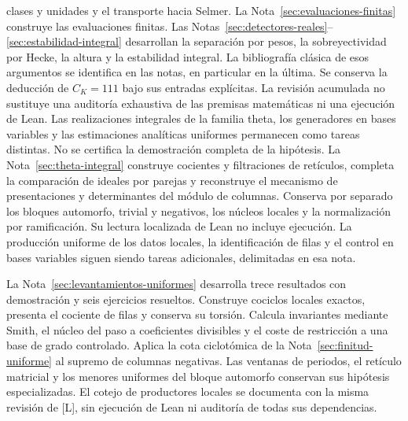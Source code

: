 clases y unidades y el transporte hacia Selmer. La Nota~\ref{sec:evaluaciones-finitas}
construye las evaluaciones finitas. Las Notas~\ref{sec:detectores-reales}--\ref{sec:estabilidad-integral}
desarrollan la separación por pesos, la sobreyectividad por Hecke,
la altura y la estabilidad integral. La bibliografía clásica de esos
argumentos se identifica en las notas, en particular en la última.
Se conserva la deducción de $C_K=111$ bajo sus entradas explícitas.
La revisión acumulada no sustituye una auditoría exhaustiva de las
premisas matemáticas ni una ejecución de Lean. Las realizaciones
integrales de la familia theta, los generadores en bases variables y
las estimaciones analíticas uniformes permanecen como tareas distintas.
No se certifica la demostración completa de la hipótesis.
La Nota~\ref{sec:theta-integral} construye cocientes y filtraciones
de retículos, completa la comparación de ideales por parejas y
reconstruye el mecanismo de presentaciones y determinantes del
módulo de columnas. Conserva por separado los bloques automorfo,
trivial y negativos, los núcleos locales y la normalización por
ramificación. Su lectura localizada de Lean no incluye ejecución.
La producción uniforme de los datos locales, la identificación
de filas y el control en bases variables siguen siendo tareas
adicionales, delimitadas en esa nota.

La Nota~\ref{sec:levantamientos-uniformes} desarrolla trece resultados
con demostración y seis ejercicios resueltos. Construye cociclos
locales exactos, presenta el cociente de filas y conserva su torsión.
Calcula invariantes mediante Smith, el núcleo del paso a coeficientes
divisibles y el coste de restricción a una base de grado controlado.
Aplica la cota ciclotómica de la Nota~\ref{sec:finitud-uniforme}
al supremo de columnas negativas. Las ventanas de periodos, el
retículo matricial y los menores uniformes del bloque automorfo
conservan sus hipótesis especializadas. El cotejo de productores
locales se documenta con la misma revisión de [L], sin ejecución
de Lean ni auditoría de todas sus dependencias.
\par
\endgroup

